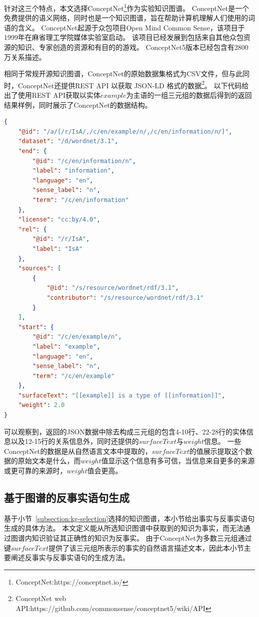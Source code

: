 针对这三个特点，本文选择ConceptNet\footnote{ConceptNet:https://conceptnet.io/}作为实验知识图谱。
ConceptNet是一个免费提供的语义网络，同时也是一个知识图谱，旨在帮助计算机理解人们使用的词语的含义。
ConceptNet起源于众包项目Open Mind Common Sense，该项目于1999年在麻省理工学院媒体实验室启动。
该项目已经发展到包括来自其他众包资源的知识、专家创造的资源和有目的的游戏。
ConceptNet5版本已经包含有2800万关系描述。

相同于常规开源知识图谱，ConceptNet的原始数据集格式为CSV文件，但与此同时，ConceptNet还提供REST API 以获取 JSON-LD 格式的数据\footnote{ConceptNet web API:https://github.com/commonsense/conceptnet5/wiki/API}。
以下代码给出了使用REST API获取以实体$example$为主语的一组三元组的数据后得到的返回结果样例，同时展示了ConceptNet的数据结构。


\begin{lstlisting}[language=json,firstnumber=1]
{
    "@id": "/a/[/r/IsA/,/c/en/example/n/,/c/en/information/n/]",
    "dataset": "/d/wordnet/3.1",
    "end": {
        "@id": "/c/en/information/n",
        "label": "information",
        "language": "en",
        "sense_label": "n",
        "term": "/c/en/information"
    },
    "license": "cc:by/4.0",
    "rel": {
        "@id": "/r/IsA",
        "label": "IsA"
    },
    "sources": [
        {
            "@id": "/s/resource/wordnet/rdf/3.1",
            "contributor": "/s/resource/wordnet/rdf/3.1"
        }
    ],
    "start": {
        "@id": "/c/en/example/n",
        "label": "example",
        "language": "en",
        "sense_label": "n",
        "term": "/c/en/example"
    },
    "surfaceText": "[[example]] is a type of [[information]]",
    "weight": 2.0
}
\end{lstlisting}

可以观察到，返回的JSON数据中除去构成三元组的包含4-10行、22-28行的实体信息以及12-15行的关系信息外，同时还提供的$surfaceText$与$weight$信息。
一些ConceptNet的数据是从自然语言文本中提取的，$surfaceText$的值展示提取这个数据的原始文本是什么，而$weight$值显示这个信息有多可信，当信息来自更多的来源或更可靠的来源时，$weight$值会更高。


\subsection{基于图谱的反事实语句生成}
基于小节~\ref{subsection:kg-selection}选择的知识图谱，本小节给出事实与反事实语句生成的具体方法。
本文定义能从所选知识图谱中获取到的知识为事实，而无法通过图谱内知识验证其正确性的知识为反事实。
由于ConceptNet为多数三元组通过键$surfaceText$提供了该三元组所表示的事实的自然语言描述文本，因此本小节主要阐述反事实与反事实语句的生成方法。

